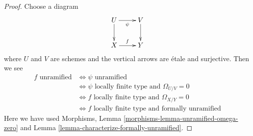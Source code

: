 \documentclass[10pt,a4paper]{amsart}
\theoremstyle{plain}
\theoremstyle{definition}
\theoremstyle{remark}
\numberwithin{equation}{subsection}
\begin{document}
\begin{proof}
Choose a diagram
$$
\xymatrix{
U \ar[d] \ar[r]_\psi & V \ar[d] \\
X \ar[r]^f & Y
}
$$
where $U$ and $V$ are schemes and the vertical arrows are \'etale and
surjective. Then we see
\begin{align*}
f\text{ unramified}
& \Leftrightarrow
\psi\text{ unramified} \\
& \Leftrightarrow
\psi\text{ locally finite type and }\Omega_{U/V} = 0 \\
& \Leftrightarrow
f\text{ locally finite type and }\Omega_{X/Y} = 0 \\
& \Leftrightarrow
f\text{ locally finite type and formally unramified}
\end{align*}
Here we have used
Morphisms, Lemma \ref{morphisms-lemma-unramified-omega-zero} and
Lemma \ref{lemma-characterize-formally-unramified}.
\end{proof}
\end{document}
